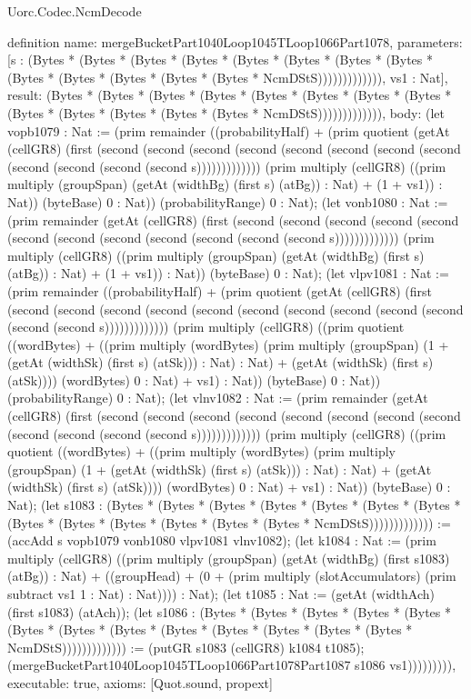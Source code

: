 \begin{lexlean}{Uorc.Codec.NcmDecode}
\begin{semanticmodule}
definition{
  name: mergeBucketPart1040Loop1045TLoop1066Part1078,
  parameters: [s : (Bytes * (Bytes * (Bytes * (Bytes * (Bytes * (Bytes * (Bytes * (Bytes * (Bytes * (Bytes * (Bytes * (Bytes * (Bytes * NcmDStS))))))))))))), vs1 : Nat],
  result: (Bytes * (Bytes * (Bytes * (Bytes * (Bytes * (Bytes * (Bytes * (Bytes * (Bytes * (Bytes * (Bytes * (Bytes * (Bytes * NcmDStS))))))))))))),
  body: (let vopb1079 : Nat := (prim remainder ((probabilityHalf) + (prim quotient (getAt (cellGR8) (first (second (second (second (second (second (second (second (second (second (second (second (second s))))))))))))) (prim multiply (cellGR8) ((prim multiply (groupSpan) (getAt (widthBg) (first s) (atBg)) : Nat) + (1 + vs1)) : Nat)) (byteBase) 0 : Nat)) (probabilityRange) 0 : Nat); (let vonb1080 : Nat := (prim remainder (getAt (cellGR8) (first (second (second (second (second (second (second (second (second (second (second (second (second s))))))))))))) (prim multiply (cellGR8) ((prim multiply (groupSpan) (getAt (widthBg) (first s) (atBg)) : Nat) + (1 + vs1)) : Nat)) (byteBase) 0 : Nat); (let vlpv1081 : Nat := (prim remainder ((probabilityHalf) + (prim quotient (getAt (cellGR8) (first (second (second (second (second (second (second (second (second (second (second (second (second s))))))))))))) (prim multiply (cellGR8) ((prim quotient ((wordBytes) + ((prim multiply (wordBytes) (prim multiply (groupSpan) (1 + (getAt (widthSk) (first s) (atSk))) : Nat) : Nat) + (getAt (widthSk) (first s) (atSk)))) (wordBytes) 0 : Nat) + vs1) : Nat)) (byteBase) 0 : Nat)) (probabilityRange) 0 : Nat); (let vlnv1082 : Nat := (prim remainder (getAt (cellGR8) (first (second (second (second (second (second (second (second (second (second (second (second (second s))))))))))))) (prim multiply (cellGR8) ((prim quotient ((wordBytes) + ((prim multiply (wordBytes) (prim multiply (groupSpan) (1 + (getAt (widthSk) (first s) (atSk))) : Nat) : Nat) + (getAt (widthSk) (first s) (atSk)))) (wordBytes) 0 : Nat) + vs1) : Nat)) (byteBase) 0 : Nat); (let s1083 : (Bytes * (Bytes * (Bytes * (Bytes * (Bytes * (Bytes * (Bytes * (Bytes * (Bytes * (Bytes * (Bytes * (Bytes * (Bytes * NcmDStS))))))))))))) := (accAdd s vopb1079 vonb1080 vlpv1081 vlnv1082); (let k1084 : Nat := (prim multiply (cellGR8) ((prim multiply (groupSpan) (getAt (widthBg) (first s1083) (atBg)) : Nat) + ((groupHead) + (0 + (prim multiply (slotAccumulators) (prim subtract vs1 1 : Nat) : Nat)))) : Nat); (let t1085 : Nat := (getAt (widthAch) (first s1083) (atAch)); (let s1086 : (Bytes * (Bytes * (Bytes * (Bytes * (Bytes * (Bytes * (Bytes * (Bytes * (Bytes * (Bytes * (Bytes * (Bytes * (Bytes * NcmDStS))))))))))))) := (putGR s1083 (cellGR8) k1084 t1085); (mergeBucketPart1040Loop1045TLoop1066Part1078Part1087 s1086 vs1))))))))),
  executable: true,
  axioms: [Quot.sound, propext]
}


\end{semanticmodule}
\end{lexlean}
